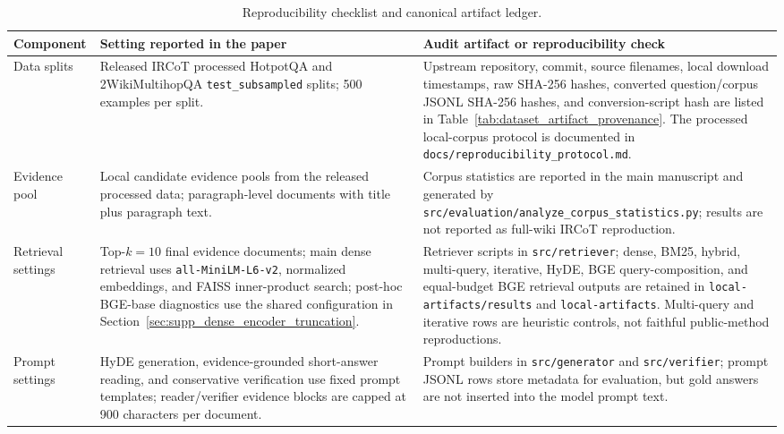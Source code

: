 \begin{table}[t]
\centering
\caption{Reproducibility checklist and canonical artifact ledger.}
\label{tab:reproducibility_checklist}
\scriptsize
\begin{threeparttable}
\setlength{\tabcolsep}{3pt}
\begin{tabularx}{\textwidth}{>{\raggedright\arraybackslash}p{}
                            >{\raggedright\arraybackslash}p{}
                            >{\raggedright\arraybackslash}X}
\toprule
Component & Setting reported in the paper & Audit artifact or reproducibility check \\
\midrule
Data splits & Released IRCoT processed HotpotQA and 2WikiMultihopQA \texttt{test\_subsampled} splits; 500 examples per split. & Upstream repository, commit, source filenames, local download timestamps, raw SHA-256 hashes, converted question/corpus JSONL SHA-256 hashes, and conversion-script hash are listed in Table~\ref{tab:dataset_artifact_provenance}. The processed local-corpus protocol is documented in \texttt{docs/reproducibility\_protocol.md}. \\
Evidence pool & Local candidate evidence pools from the released processed data; paragraph-level documents with title plus paragraph text. & Corpus statistics are reported in the main manuscript and generated by \texttt{src/evaluation/analyze\_corpus\_statistics.py}; results are not reported as full-wiki IRCoT reproduction. \\
Retrieval settings & Top-$k=10$ final evidence documents; main dense retrieval uses \texttt{all-MiniLM-L6-v2}, normalized embeddings, and FAISS inner-product search; post-hoc BGE-base diagnostics use the shared configuration in Section~\ref{sec:supp_dense_encoder_truncation}. & Retriever scripts in \texttt{src/retriever}; dense, BM25, hybrid, multi-query, iterative, HyDE, BGE query-composition, and equal-budget BGE retrieval outputs are retained in \texttt{local-artifacts/results} and \texttt{local-artifacts}. Multi-query and iterative rows are heuristic controls, not faithful public-method reproductions. \\
Prompt settings & HyDE generation, evidence-grounded short-answer reading, and conservative verification use fixed prompt templates; reader/verifier evidence blocks are capped at 900 characters per document. & Prompt builders in \texttt{src/generator} and \texttt{src/verifier}; prompt JSONL rows store metadata for evaluation, but gold answers are not inserted into the model prompt text. \\

\end{tabularx}
\end{threeparttable}
\end{table}
